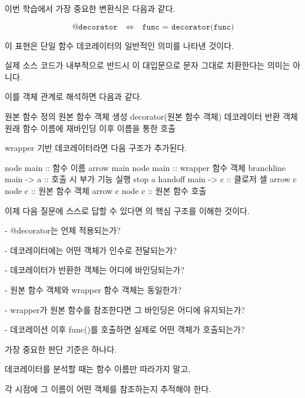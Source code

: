 이번 학습에서 가장 중요한 변환식은 다음과 같다.

\[
\texttt{@decorator}
\quad\Longleftrightarrow\quad
\texttt{func = decorator(func)}
\]

이 표현은 단일 함수 데코레이터의 일반적인 의미를 나타낸 것이다.

실제 소스 코드가 내부적으로 반드시 이 대입문으로 문자 그대로 치환한다는 의미는 아니다.

이를 객체 관계로 해석하면 다음과 같다.

\begin{dhksmry}[centered]
원본 함수 정의
\da
원본 함수 객체 생성
\da
decorator(원본 함수 객체)
\da
데코레이터 반환 객체
\da
원래 함수 이름에 재바인딩
\da
이후 이름을 통한 호출
\end{dhksmry}

wrapper 기반 데코레이터라면 다음 구조가 추가된다.

\begin{dhkbranch}[in=8]
node main :: 함수 이름
arrow main
node main :: wrapper 함수 객체
branchline main -> a :: 호출 시 부가 기능 실행
stop a
handoff main -> c :: 클로저 셀
arrow c
node c :: 원본 함수 객체
arrow c
node c :: 원본 함수 호출
\end{dhkbranch}

이제 다음 질문에 스스로 답할 수 있다면 의 핵심 구조를 이해한 것이다.

\begin{dhksmry}
    - @decorator는 언제 적용되는가?

    - 데코레이터에는 어떤 객체가 인수로 전달되는가?

    - 데코레이터가 반환한 객체는 어디에 바인딩되는가?

    - 원본 함수 객체와 wrapper 함수 객체는 동일한가?

    - wrapper가 원본 함수를 참조한다면 그 바인딩은 어디에 유지되는가?

    - 데코레이션 이후 func()를 호출하면 실제로 어떤 객체가 호출되는가?
\end{dhksmry}

가장 중요한 판단 기준은 하나다.

\begin{dhksmry}[centered]
데코레이터를 분석할 때는 함수 이름만 따라가지 말고,

각 시점에 그 이름이 어떤 객체를 참조하는지 추적해야 한다.
\end{dhksmry}